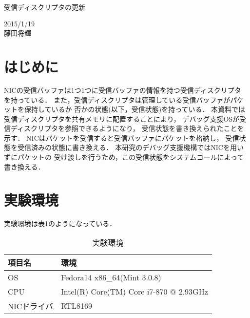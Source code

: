 \documentclass[12pt]{jsarticle}
\begin{document}

\begin{center}
{\LARGE 受信ディスクリプタの更新}
\end{center}

\begin{flushright}
  2015/1/19\\
  藤田将輝
\end{flushright}
\section{はじめに}
NICの受信バッファは1つ1つに受信バッファの情報を持つ受信ディスクリプタ
を持っている．
また，受信ディスクリプタは管理している受信バッファがパケットを保持しているか
否かの状態(以下，受信状態)を持っている．
本資料では受信ディスクリプタを共有メモリに配置することにより，
デバッグ支援OSが受信ディスクリプタを参照できるようになり，
受信状態を書き換えられたことを示す．
NICはパケットを受信すると受信バッファにパケットを格納し，
受信状態を受信済みの状態に書き換える．
本研究のデバッグ支援機構ではNICを用いずにパケットの
受け渡しを行うため，この受信状態をシステムコールによって
書き換える．
\section{実験環境}
実験環境は表1のようになっている．
\begin{table}[htbp]
\caption{実験環境}
\label{kankyou}
\begin{center}
\begin{tabular}{|l|l|}   \hline 
項目名      & 環境    \\ \hline \hline
OS          & Fedora14 x86\_64(Mint 3.0.8)  \\ \hline
CPU         & Intel(R) Core(TM) Core i7-870 @ 2.93GHz \\ \hline
NICドライバ & RTL8169    \\ \hline
           
\end{tabular}
\end{center}
\end{table}
\end{document}
